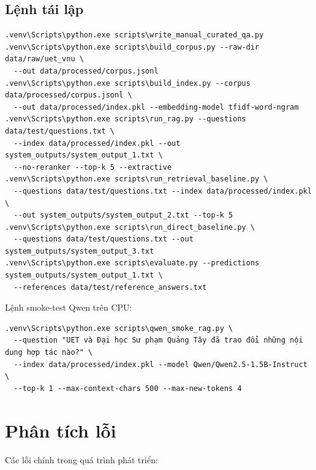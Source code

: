 \documentclass[12pt,a4paper]{article}
\begin{document}
\subsection{Lệnh tái lập}

\begin{verbatim}
.venv\Scripts\python.exe scripts\write_manual_curated_qa.py
.venv\Scripts\python.exe scripts\build_corpus.py --raw-dir data/raw/uet_vnu \
  --out data/processed/corpus.jsonl
.venv\Scripts\python.exe scripts\build_index.py --corpus data/processed/corpus.jsonl \
  --out data/processed/index.pkl --embedding-model tfidf-word-ngram
.venv\Scripts\python.exe scripts\run_rag.py --questions data/test/questions.txt \
  --index data/processed/index.pkl --out system_outputs/system_output_1.txt \
  --no-reranker --top-k 5 --extractive
.venv\Scripts\python.exe scripts\run_retrieval_baseline.py \
  --questions data/test/questions.txt --index data/processed/index.pkl \
  --out system_outputs/system_output_2.txt --top-k 5
.venv\Scripts\python.exe scripts\run_direct_baseline.py \
  --questions data/test/questions.txt --out system_outputs/system_output_3.txt
.venv\Scripts\python.exe scripts\evaluate.py --predictions system_outputs/system_output_1.txt \
  --references data/test/reference_answers.txt
\end{verbatim}

Lệnh smoke-test Qwen trên CPU:

\begin{verbatim}
.venv\Scripts\python.exe scripts\qwen_smoke_rag.py \
  --question "UET và Đại học Sư phạm Quảng Tây đã trao đổi những nội dung hợp tác nào?" \
  --index data/processed/index.pkl --model Qwen/Qwen2.5-1.5B-Instruct \
  --top-k 1 --max-context-chars 500 --max-new-tokens 4
\end{verbatim}

\section{Phân tích lỗi}

Các lỗi chính trong quá trình phát triển:
\end{document}
